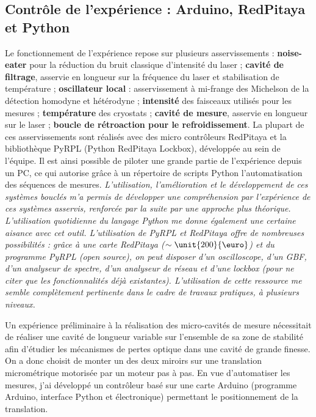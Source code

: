 \documentclass[12pt,a4paper]{article}
\begin{document}
\subsection{Contrôle de l'expérience : Arduino, RedPitaya et Python}

Le fonctionnement de l'expérience repose sur plusieurs asservissements : \textbf{noise-eater} pour la réduction du bruit classique d'intensité du laser ; \textbf{cavité de filtrage}, asservie en longueur sur la fréquence du laser et stabilisation de température ; \textbf{oscillateur local} : asservissement à mi-frange des Michelson de la détection homodyne et hétérodyne ; \textbf{intensité} des faisceaux utilisés pour les mesures ; \textbf{température} des cryostats ; \textbf{cavité de mesure}, asservie en longueur sur le laser ; \textbf{boucle de rétroaction pour le refroidissement}.
La plupart de ces asservissements sont réalisés avec des micro contrôleurs RedPitaya et la bibliothèque PyRPL (Python RedPitaya Lockbox), développée au sein de l'équipe.
Il est ainsi possible de piloter une grande partie de l'expérience depuis un PC, ce qui autorise grâce à un répertoire de scripts Python l'automatisation des séquences de mesures.
\textit{L'utilisation, l'amélioration et le développement de ces systèmes bouclés m'a permis de développer une compréhension par l'expérience de ces systèmes asservis, renforcée par la suite par une approche plus théorique.
L'utilisation quotidienne du langage Python me donne également une certaine aisance avec cet outil.
L'utilisation de PyRPL et RedPitaya offre de nombreuses possibilités : grâce à une carte RedPitaya ($\sim\unit{200}{\text{\euro}}$) et du programme PyRPL (open source), on peut disposer d'un oscilloscope, d'un GBF, d'un analyseur de spectre, d'un analyseur de réseau et d'une lockbox (pour ne citer que les fonctionnalités déjà existantes). L'utilisation de cette ressource me semble complètement pertinente dans le cadre de travaux pratiques, à plusieurs niveaux.}

Un expérience préliminaire à la réalisation des micro-cavités de mesure nécessitait de réaliser une cavité de longueur variable sur l'ensemble de sa zone de stabilité afin d'étudier les mécanismes de pertes optique dans une cavité de grande finesse.
On a donc choisit de monter un des deux miroirs sur une translation micrométrique motorisée par un moteur pas à pas.
En vue d'automatiser les mesures, j'ai développé un contrôleur basé sur une carte Arduino (programme Arduino, interface Python et électronique) permettant le positionnement de la translation.
\end{document}
